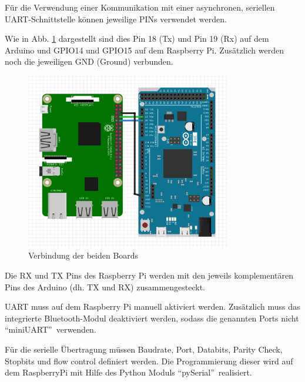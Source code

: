 \documentclass[a4paper]{report}
\begin{document}
Für die Verwendung einer Kommunikation mit einer asynchronen, seriellen UART-Schnittstelle können jeweilige PINs verwendet werden.

Wie in Abb. \ref{fig:RaspberryPins} dargestellt sind dies Pin 18 (Tx) und Pin 19 (Rx) auf dem Arduino und GPIO14 und GPIO15 auf dem Raspberry Pi. Zusätzlich werden noch die jeweiligen GND (Ground) verbunden. 
\begin{figure}[h!]
	\centering
	\includegraphics[keepaspectratio, width=0.8\textwidth]{SchemaKommunikationArduinoRaspbiScreenshot}
	\caption{Verbindung der beiden Boards}

	\label{fig:RaspberryPins}
\end{figure}

Die RX und TX Pins des Raspberry Pi werden mit den jeweils komplementären Pins des Arduino (dh. TX und RX) zusammengesteckt.

UART muss auf dem Raspberry Pi manuell aktiviert werden.  Zusätzlich muss das integrierte Bluetooth-Modul deaktiviert werden, sodass die genannten Ports nicht \textquotedblleft miniUART\textquotedblright\ verwenden.

Für die serielle Übertragung müssen Baudrate, Port, Databits, Parity Check, Stopbits und flow control definiert werden. Die Programm\-ierung dieser wird auf dem RaspberryPi mit Hilfe des Python Moduls \textquotedblleft pySerial\textquotedblright\ realisiert.

\newpage
\end{document}
